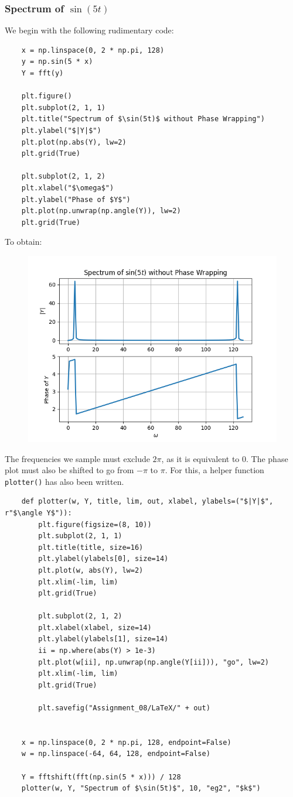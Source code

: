 \documentclass[12pt, a4paper]{article}
\newcommand{\code}{\lstinline[basicstyle=\small]}
\begin{document}
\subsubsection{Spectrum of $\sin(5t)$}
We begin with the following rudimentary code:
\begin{lstlisting}
    x = np.linspace(0, 2 * np.pi, 128)
    y = np.sin(5 * x)
    Y = fft(y)

    plt.figure()
    plt.subplot(2, 1, 1)
    plt.title("Spectrum of $\sin(5t)$ without Phase Wrapping")
    plt.ylabel("$|Y|$")
    plt.plot(np.abs(Y), lw=2)
    plt.grid(True)

    plt.subplot(2, 1, 2)
    plt.xlabel("$\omega$")
    plt.ylabel("Phase of $Y$")
    plt.plot(np.unwrap(np.angle(Y)), lw=2)
    plt.grid(True)
\end{lstlisting}
To obtain:
\begin{figure}[H]
    \centering
    \includegraphics[scale=0.8]{eg1.png}
\end{figure}
The frequencies we sample must exclude $2\pi$, as it is equivalent to 0. The phase plot must also be shifted
to go from $-\pi$ to $\pi$. For this, a helper function \code{plotter()} has also been written.
\begin{lstlisting}
    def plotter(w, Y, title, lim, out, xlabel, ylabels=("$|Y|$", r"$\angle Y$")):
        plt.figure(figsize=(8, 10))
        plt.subplot(2, 1, 1)
        plt.title(title, size=16)
        plt.ylabel(ylabels[0], size=14)
        plt.plot(w, abs(Y), lw=2)
        plt.xlim(-lim, lim)
        plt.grid(True)

        plt.subplot(2, 1, 2)
        plt.xlabel(xlabel, size=14)
        plt.ylabel(ylabels[1], size=14)
        ii = np.where(abs(Y) > 1e-3)
        plt.plot(w[ii], np.unwrap(np.angle(Y[ii])), "go", lw=2)
        plt.xlim(-lim, lim)
        plt.grid(True)

        plt.savefig("Assignment_08/LaTeX/" + out)


    x = np.linspace(0, 2 * np.pi, 128, endpoint=False)
    w = np.linspace(-64, 64, 128, endpoint=False)

    Y = fftshift(fft(np.sin(5 * x))) / 128
    plotter(w, Y, "Spectrum of $\sin(5t)$", 10, "eg2", "$k$")
\end{lstlisting}
\end{document}
